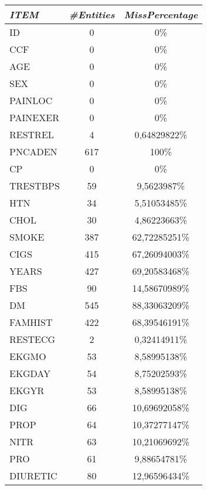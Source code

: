 \documentclass[a4paper,12pt]{article}
\begin{document}
    \begin{multicols}{2}
            \begin{tabular}{|l|c|c|} \hline

                \textit{ITEM} & \textit{\#Entities}	& \textit{MissPercentage} \\
                \hline ID&	0&	0\% \\
                \hline CCF&	0&	0\% \\
                \hline AGE&	0&	0\% \\
                \hline SEX&	0&	0\% \\
                \hline PAINLOC&	0&	0\% \\
                \hline PAINEXER&	0&	0\% \\
                \hline RESTREL&	4&	0,64829822\% \\
                \hline PNCADEN&	617&	100\% \\
                \hline CP	&0&	0\% \\
                \hline TRESTBPS&	59&	9,5623987\% \\
                \hline HTN	&34&	5,51053485\% \\
                \hline CHOL	&30&	4,86223663\% \\
                \hline SMOKE	&387&	62,72285251\% \\
                \hline CIGS	&415&	67,26094003\% \\
                \hline YEARS	&427&	69,20583468\% \\
                \hline FBS	&90&	14,58670989\% \\
                \hline DM	&545&	88,33063209\% \\
                \hline FAMHIST&	422	&68,39546191\% \\
                \hline RESTECG&	2&	0,32414911\% \\
                \hline EKGMO	&53&	8,58995138\% \\
                \hline EKGDAY&	54&	8,75202593\% \\
                \hline EKGYR	&53&	8,58995138\% \\
                \hline DIG	&66	&10,69692058\% \\
                \hline PROP	&64	&10,37277147\% \\
                \hline NITR	&63	&10,21069692\% \\
                \hline PRO&	61	&9,88654781\% \\
                \hline DIURETIC	&80&	12,96596434\% \\ \hline
            

\end{tabular}
\end{multicols}
\end{document}
